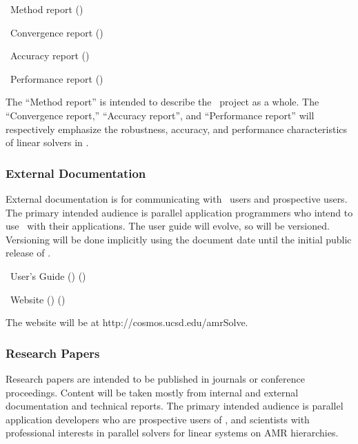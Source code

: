 \documentclass[11pt]{article}
\begin{document}
\BeginENUMERATE
  \item  \amrSolve\ Method report      ()
  \item  \amrSolve\ Convergence report ()
  \item  \amrSolve\ Accuracy report    ()
  \item  \amrSolve\ Performance report ()
\EndENUMERATE

The ``Method report'' is intended to describe the \amrSolve\ project
as a whole.  The ``Convergence report,'' ``Accuracy report'', and
``Performance report'' will respectively emphasize the robustness,
accuracy, and performance characteristics of linear solvers in
\amrSolve.


\subsubsection{External Documentation}

External documentation is for communicating with \amrSolve\ users and
prospective users.  The primary intended audience is parallel
application programmers who intend to use \amrSolve\ with their
applications.  The user guide will evolve, so will be versioned.
Versioning will be done implicitly using the document date until the
initial public release of \amrSolve.

\BeginENUMERATE
  \item  \amrSolve\ User's Guide      () ()
  \item  \amrSolve\ Website           () ()
\EndENUMERATE

The website will be at \textsf{http://cosmos.ucsd.edu/amrSolve}.


\subsubsection{Research Papers}

Research papers are intended to be published in journals or conference
proceedings.  Content will be taken mostly from internal and external
documentation and technical reports.  The primary intended audience is
parallel application developers who are prospective users of
\amrSolve, and scientists with professional interests in
parallel solvers for linear systems on AMR hierarchies.
\end{document}
